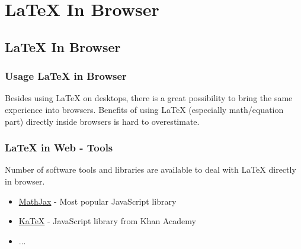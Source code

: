 \documentclass[slidestop,compress,mathserif]{beamer}
\begin{document}


\section[LaTeX In Browser]{LaTeX In Browser}

\subsection{LaTeX In Browser}
	
	\begin{frame} \frametitle{Usage LaTeX in Browser}
		Besides using LaTeX on desktops, there is a great possibility to bring the same experience into browsers. Benefits of using LaTeX (especially math/equation part) directly inside browsers is hard to overestimate.
	\end{frame}
	
	\begin{frame} \frametitle{LaTeX in Web - Tools}
		Number of software tools and libraries are available to deal with LaTeX directly in browser.\\
		
		\begin{itemize}
			\item \href{https://www.mathjax.org/}{MathJax} - Most popular JavaScript library
			\item \href{https://khan.github.io/KaTeX/}{KaTeX} - JavaScript library from Khan Academy
			\item ...
		\end{itemize}
	
	\end{frame}
	
\end{document}
